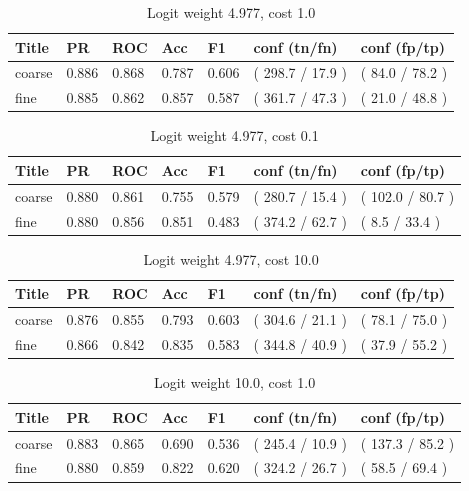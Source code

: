 \documentclass[ms]{nuthesis}
\begin{document}
\FloatBarrier
\begin{table}[H]
\centering
\caption{Logit weight 4.977, cost 1.0}
\label{tab:LogRegWtOrig-C1}
\begin{tabular}{|l||l||l||l||l||l||l|}\toprule
Title & PR & ROC & Acc & F1 & conf (tn/fn) & conf (fp/tp) \\ \midrule
coarse & 0.886 & 0.868 & 0.787 & 0.606 & ( 298.7 / 17.9 ) & ( 84.0 / 78.2 ) \\
fine & 0.885 & 0.862 & 0.857 & 0.587 & ( 361.7 / 47.3 ) & ( 21.0 / 48.8 ) \\ \bottomrule
\end{tabular}
\end{table}
\FloatBarrier

\FloatBarrier
\begin{table}[H]
\centering
\caption{Logit weight 4.977, cost 0.1}
\label{tab:LogRegWtOrig-Cp1}
\begin{tabular}{|l||l||l||l||l||l||l|}\toprule
Title & PR & ROC & Acc & F1 & conf (tn/fn) & conf (fp/tp) \\ \midrule
coarse & 0.880 & 0.861 & 0.755 & 0.579 & ( 280.7 / 15.4 ) & ( 102.0 / 80.7 ) \\
fine & 0.880 & 0.856 & 0.851 & 0.483 & ( 374.2 / 62.7 ) & ( 8.5 / 33.4 ) \\ \bottomrule
\end{tabular}
\end{table}
\FloatBarrier


\FloatBarrier
\begin{table}[H]
\centering
\caption{Logit weight 4.977, cost 10.0}
\label{tab:LogRegWtOrig-C10}
\begin{tabular}{|l||l||l||l||l||l||l|}\toprule
Title & PR & ROC & Acc & F1 & conf (tn/fn) & conf (fp/tp) \\ \midrule
coarse & 0.876 & 0.855 & 0.793 & 0.603 & ( 304.6 / 21.1 ) & ( 78.1 / 75.0 ) \\
fine & 0.866 & 0.842 & 0.835 & 0.583 & ( 344.8 / 40.9 ) & ( 37.9 / 55.2 ) \\ \bottomrule
\end{tabular}
\end{table}
\FloatBarrier


\FloatBarrier
\begin{table}[H]
\centering
\caption{Logit weight 10.0, cost 1.0}
\label{tab:LogRegWt10-C1}
\begin{tabular}{|l||l||l||l||l||l||l|}\toprule
Title & PR & ROC & Acc & F1 & conf (tn/fn) & conf (fp/tp) \\ \midrule
coarse & 0.883 & 0.865 & 0.690 & 0.536 & ( 245.4 / 10.9 ) & ( 137.3 / 85.2 ) \\
fine & 0.880 & 0.859 & 0.822 & 0.620 & ( 324.2 / 26.7 ) & ( 58.5 / 69.4 ) \\ \bottomrule
\end{tabular}
\end{table}
\FloatBarrier
\end{document}

